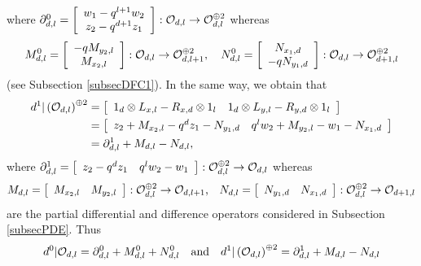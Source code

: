 \documentclass[12pt,reqno]{amsart}%
\theoremstyle{plain}
\numberwithin{theorem}{section} \numberwithin{equation}{section}
\numberwithin{lemma}{section}
\numberwithin{remark}{section}
\numberwithin{example}{section}
\numberwithin{proposition}{section}
\numberwithin{definition}{section}
\numberwithin{corollary}{section}
\begin{document}
where $\partial_{d,l}^{0}=\left[
\begin{array}
[c]{c}%
w_{1}-q^{l+1}w_{2}\\
z_{2}-q^{d+1}z_{1}%
\end{array}
\right]  :\mathcal{O}_{d,l}\rightarrow\mathcal{O}_{d,l}^{\oplus2}$ whereas
\[
M_{d,l}^{0}=\left[
\begin{array}
[c]{c}%
-qM_{y_{2},l}\\
M_{x_{2},l}%
\end{array}
\right]  :\mathcal{O}_{d,l}\rightarrow\mathcal{O}_{d,l+1}^{\oplus2},\quad
N_{d,l}^{0}=\left[
\begin{array}
[c]{c}%
N_{x_{1},d}\\
-qN_{y_{1},d}%
\end{array}
\right]  :\mathcal{O}_{d,l}\rightarrow\mathcal{O}_{d+1,l}^{\oplus2}%
\]
(see Subsection \ref{subsecDFC1}). In the same way, we obtain that
\begin{align*}
d^{1}|\left(  \mathcal{O}_{d,l}\right)  ^{\oplus2}  &  =\left[
\begin{array}
[c]{cc}%
1_{d}\otimes L_{x,l}-R_{x,d}\otimes1_{l} & 1_{d}\otimes L_{y,l}-R_{y,d}%
\otimes1_{l}%
\end{array}
\right] \\
&  =\left[
\begin{array}
[c]{cc}%
z_{2}+M_{x_{2},l}-q^{d}z_{1}-N_{y_{1},d} & q^{l}w_{2}+M_{y_{2},l}%
-w_{1}-N_{x_{1},d}%
\end{array}
\right] \\
&  =\partial_{d,l}^{1}+M_{d,l}-N_{d,l},
\end{align*}
where $\partial_{d,l}^{1}=\left[
\begin{array}
[c]{cc}%
z_{2}-q^{d}z_{1} & q^{l}w_{2}-w_{1}%
\end{array}
\right]  :\mathcal{O}_{d,l}^{\oplus2}\rightarrow\mathcal{O}_{d,l}$ whereas
\[
M_{d,l}=\left[
\begin{array}
[c]{cc}%
M_{x_{2},l} & M_{y_{2},l}%
\end{array}
\right]  :\mathcal{O}_{d,l}^{\oplus2}\rightarrow\mathcal{O}_{d,l+1}%
\text{,\quad}N_{d,l}=\left[
\begin{array}
[c]{cc}%
N_{y_{1},d} & N_{x_{1},d}%
\end{array}
\right]  :\mathcal{O}_{d,l}^{\oplus2}\rightarrow\mathcal{O}_{d+1,l}%
\]
are the partial differential and difference operators considered in Subsection
\ref{subsecPDE}. Thus
\begin{equation}
d^{0}|\mathcal{O}_{d,l}=\partial_{d,l}^{0}+M_{d,l}^{0}+N_{d,l}^{0}%
\quad\text{and\quad}d^{1}|\left(  \mathcal{O}_{d,l}\right)  ^{\oplus
2}=\partial_{d,l}^{1}+M_{d,l}-N_{d,l} \label{dd01}%
\end{equation}
\end{document}
